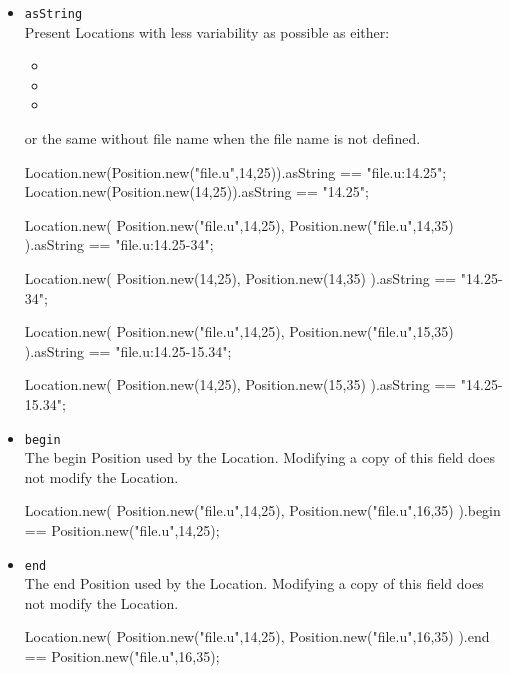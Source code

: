 \begin{itemize}

\item \lstinline|asString|\\
  Present Locations with less variability as possible as either:
  \begin{itemize}
  \item {}
  \item {}
  \item {}
  \end{itemize}
  or the same without file name when the file name is not defined.
\begin{urbiassert}
Location.new(Position.new("file.u",14,25)).asString == "file.u:14.25";
Location.new(Position.new(14,25)).asString == "14.25";

Location.new(
  Position.new("file.u",14,25),
  Position.new("file.u",14,35)
).asString == "file.u:14.25-34";

Location.new(
  Position.new(14,25),
  Position.new(14,35)
).asString == "14.25-34";

Location.new(
  Position.new("file.u",14,25),
  Position.new("file.u",15,35)
).asString == "file.u:14.25-15.34";

Location.new(
  Position.new(14,25),
  Position.new(15,35)
).asString == "14.25-15.34";
\end{urbiassert}

\item \lstinline|begin|\\
  The begin Position used by the Location.  Modifying a copy of this field
  does not modify the Location.
\begin{urbiassert}
Location.new(
  Position.new("file.u",14,25),
  Position.new("file.u",16,35)
).begin == Position.new("file.u",14,25);
\end{urbiassert}

\item \lstinline|end|\\
  The end Position used by the Location.  Modifying a copy of this field
  does not modify the Location.
\begin{urbiassert}
Location.new(
  Position.new("file.u",14,25),
  Position.new("file.u",16,35)
).end == Position.new("file.u",16,35);
\end{urbiassert}


\end{itemize}

